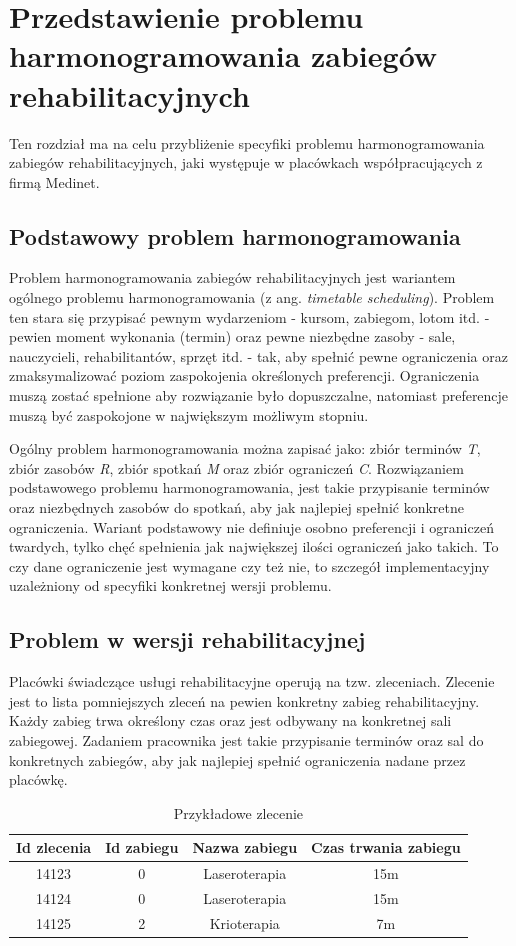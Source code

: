 \chapter{Przedstawienie problemu harmonogramowania zabiegów rehabilitacyjnych}
Ten rozdział ma na celu przybliżenie specyfiki problemu harmonogramowania zabiegów
rehabilitacyjnych, jaki występuje w placówkach współpracujących z firmą Medinet.

\section{Podstawowy problem harmonogramowania}
Problem harmonogramowania zabiegów rehabilitacyjnych jest wariantem ogólnego problemu
harmonogramowania (z ang. \emph{timetable scheduling}). Problem ten  stara się
przypisać pewnym wydarzeniom - kursom, zabiegom, lotom itd. - pewien moment
wykonania (termin) oraz pewne niezbędne zasoby - sale, nauczycieli,
rehabilitantów, sprzęt itd. - tak, aby spełnić pewne ograniczenia oraz
zmaksymalizować poziom zaspokojenia określonych preferencji. Ograniczenia muszą
zostać spełnione aby rozwiązanie było dopuszczalne, natomiast preferencje muszą
być zaspokojone w największym możliwym stopniu.

Ogólny problem harmonogramowania można zapisać \cite{habib2013} jako:
zbiór terminów \emph{T}, zbiór zasobów \emph{R}, zbiór spotkań \emph{M} oraz
zbiór ograniczeń \emph{C}. Rozwiązaniem podstawowego problemu harmonogramowania,
jest takie przypisanie terminów oraz niezbędnych zasobów do spotkań, aby jak
najlepiej spełnić konkretne ograniczenia. Wariant podstawowy nie definiuje
osobno preferencji i ograniczeń twardych, tylko chęć spełnienia jak największej ilości ograniczeń
jako takich. To czy dane ograniczenie jest wymagane czy też nie, to szczegół
implementacyjny uzależniony od specyfiki konkretnej wersji problemu.
\pagebreak
\section{Problem w wersji rehabilitacyjnej}
\label{problem-desc}
Placówki świadczące usługi rehabilitacyjne operują na tzw. zleceniach. Zlecenie
jest to lista pomniejszych zleceń na pewien konkretny zabieg rehabilitacyjny.
Każdy zabieg trwa określony czas oraz jest odbywany na konkretnej sali
zabiegowej. Zadaniem pracownika jest takie przypisanie terminów oraz sal do konkretnych
zabiegów, aby jak najlepiej spełnić ograniczenia nadane przez placówkę.

\begin{table}[h]
	\centering
	\begin{tabular}{ | c | c | c | c | }
		\hline
	\bfseries Id zlecenia & \bfseries Id zabiegu & \bfseries Nazwa zabiegu & \bfseries Czas trwania zabiegu \\
	\hline
	14123 & 0 & Laseroterapia & 15m \\
		\hline
	14124 & 0 & Laseroterapia & 15m \\
		\hline
	14125 & 2 & Krioterapia & 7m \\
		\hline
	\end{tabular}
	\caption{Przykładowe zlecenie}
	\label{example-referral}
\end{table}


